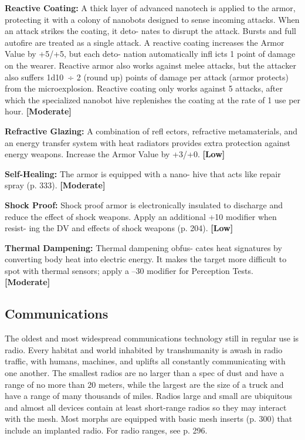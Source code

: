 \textbf{Reactive Coating:} A thick layer of advanced 
nanotech is applied to the armor, protecting it with 
a colony of nanobots designed to sense incoming 
attacks. When an attack strikes the coating, it deto-
nates to disrupt the attack. Bursts and full autofire 
are treated as a single attack. A reactive coating 
increases the Armor Value by +5/+5, but each deto-
nation automatically infl icts 1 point of damage on 
the wearer. Reactive armor also works against melee 
attacks, but the attacker also suffers 1d10 ÷ 2 (round 
up) points of damage per attack (armor protects) 
from the microexplosion. Reactive coating only 
works against 5 attacks, after which the specialized 
nanobot hive replenishes the coating at the rate of 1 
use per hour. \textbf{[Moderate]}

\textbf{Refractive Glazing:} A combination of refl ectors, 
refractive metamaterials, and an energy transfer 
system with heat radiators provides extra protection 
against energy weapons. Increase the Armor Value 
by +3/+0. \textbf{[Low]}

\textbf{Self-Healing:} The armor is equipped with a nano-
hive that acts like repair spray (p. 333). \textbf{[Moderate]}

\textbf{Shock Proof:} Shock proof armor is electronically 
insulated to discharge and reduce the effect of shock 
weapons. Apply an additional +10 modifier when resist-
ing the DV and effects of shock weapons (p. 204). \textbf{[Low]}

\textbf{Thermal Dampening:} Thermal dampening obfus-
cates heat signatures by converting body heat into 
electric energy. It makes the target more difficult to 
spot with thermal sensors; apply a –30 modifier for 
Perception Tests. \textbf{[Moderate]}

\subsection{Communications}

The oldest and most widespread communications 
technology still in regular use is radio. Every habitat 
and world inhabited by transhumanity is awash in 
radio traffic, with humans, machines, and uplifts all 
constantly communicating with one another. The 
smallest radios are no larger than a spec of dust and 
have a range of no more than 20 meters, while the 
largest are the size of a truck and have a range of 
many thousands of miles. Radios large and small are 
ubiquitous and almost all devices contain at least 
short-range radios so they may interact with the 
mesh. Most morphs are equipped with basic mesh 
inserts (p. 300) that include an implanted radio. For 
radio ranges, see p. 296.

